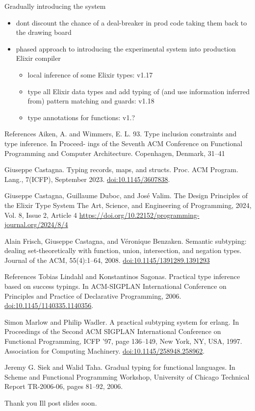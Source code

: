 \documentclass[
  ignorenonframetext,
  aspectratio=169]{beamer}
\providecommand{\tightlist}{%
  \setlength{\itemsep}{0pt}\setlength{\parskip}{0pt}}
\begin{document}
\begin{frame}{Gradually introducing the system}
\label{gradually-introducing-the-system}
\begin{itemize}
\tightlist
\item
  don\textquotesingle t discount the chance of a deal-breaker in prod
  code taking them back to the drawing board
\item
  phased approach to introducing the experimental system into production
  Elixir compiler

  \begin{itemize}
  \tightlist
  \item
    local inference of some Elixir types: v1.17
  \item
    type all Elixir data types and add typing of (and use information
    inferred from) pattern matching and guards: v1.18
  \item
    type annotations for functions: v1.?
  \end{itemize}
\end{itemize}
\end{frame}

\begin{frame}{References}
\label{references}
Aiken, A. and Wimmers, E. L. 93. Type inclusion constraints and type
inference. In Proceed- ings of the Seventh ACM Conference on Functional
Programming and Computer Architecture. Copenhagen, Denmark, 31--41

Giuseppe Castagna. Typing records, maps, and structs. Proc. ACM Program.
Lang., 7(ICFP), September 2023. \url{doi:10.1145/3607838}.

Giuseppe Castagna, Guillaume Duboc, and José Valim. The Design
Principles of the Elixir Type System The Art, Science, and Engineering
of Programming, 2024, Vol. 8, Issue 2, Article 4
\url{https://doi.org/10.22152/programming-journal.org/2024/8/4}

Alain Frisch, Giuseppe Castagna, and Véronique Benzaken. Semantic
subtyping: dealing set-theoretically with function, union, intersection,
and negation types. Journal of the ACM, 55(4):1--64, 2008.
\url{doi:10.1145/1391289.1391293}
\end{frame}

\begin{frame}{References}
\label{references-1}
Tobias Lindahl and Konstantinos Sagonas. Practical type inference based
on success typings. In ACM-SIGPLAN International Conference on
Principles and Practice of Declarative Programming, 2006.
\url{doi:10.1145/1140335.1140356}.

Simon Marlow and Philip Wadler. A practical subtyping system for erlang.
In Proceedings of the Second ACM SIGPLAN International Conference on
Functional Programming, ICFP '97, page 136--149, New York, NY, USA,
1997. Association for Computing Machinery.
\url{doi:10.1145/258948.258962}.

Jeremy G. Siek and Walid Taha. Gradual typing for functional languages.
In Scheme and Functional Programming Workshop, University of Chicago
Technical Report TR-2006-06, pages 81--92, 2006.
\end{frame}

\begin{frame}{Thank you}
\label{thank-you}
I\textquotesingle ll post slides soon.
\end{frame}
\end{document}
